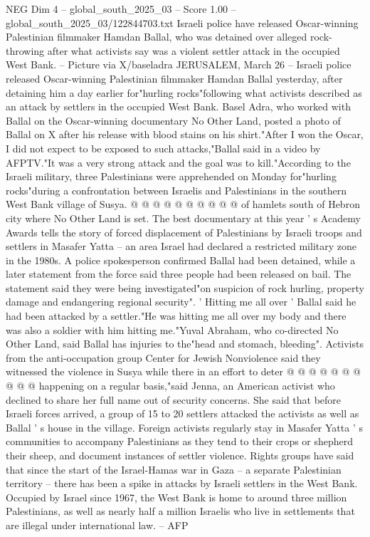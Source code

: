 \begin{textsample}{NEG Dim 4 – global\_south\_2025\_03 – Score 1.00 – global\_south\_2025\_03/122844703.txt}  \label{ex:f4_neg_429}
Israeli police have released Oscar-winning Palestinian filmmaker Hamdan Ballal, who was detained over alleged rock-throwing after what activists say was a violent settler attack in the occupied West Bank. -- Picture via X/baseladra JERUSALEM, March 26 -- Israeli police released Oscar-winning Palestinian filmmaker Hamdan Ballal yesterday, after detaining him a day earlier for"hurling rocks"following what activists described as an attack by settlers in the occupied West Bank.
Basel Adra, who worked with Ballal on the Oscar-winning documentary No Other Land, posted a photo of Ballal on X after his release with blood stains on his shirt."After I won the Oscar, I did not expect to be exposed to such attacks,"Ballal said in a video by AFPTV."It was a very strong attack and the goal was to kill."According to the Israeli military, three Palestinians were apprehended on Monday for"hurling rocks"during a confrontation between Israelis and Palestinians in the southern West Bank village of Susya. @ @ @ @ @ @ @ @ @ @ of hamlets south of Hebron city where No Other Land is set.
The best documentary at this year ' s Academy Awards tells the story of forced displacement of Palestinians by Israeli troops and settlers in Masafer Yatta -- an area Israel had declared a restricted military zone in the 1980s.
A police spokesperson confirmed Ballal had been detained, while a later statement from the force said three people had been released on bail.
The statement said they were being investigated"on suspicion of rock hurling, property damage and endangering regional security". ' Hitting me all over ' Ballal said he had been attacked by a settler."He was hitting me all over my body and there was also a soldier with him hitting me."Yuval Abraham, who co-directed No Other Land, said Ballal has injuries to the"head and stomach, bleeding".
Activists from the anti-occupation group Center for Jewish Nonviolence said they witnessed the violence in Susya while there in an effort to deter @ @ @ @ @ @ @ @ @ @ happening on a regular basis,"said Jenna, an American activist who declined to share her full name out of security concerns.
She said that before Israeli forces arrived, a group of 15 to 20 settlers attacked the activists as well as Ballal ' s house in the village.
Foreign activists regularly stay in Masafer Yatta ' s communities to accompany Palestinians as they tend to their crops or shepherd their sheep, and document instances of settler violence.
Rights groups have said that since the start of the Israel-Hamas war in Gaza -- a separate Palestinian territory -- there has been a spike in attacks by Israeli settlers in the West Bank.
Occupied by Israel since 1967, the West Bank is home to around three million Palestinians, as well as nearly half a million Israelis who live in settlements that are illegal under international law. -- AFP

\end{textsample}
